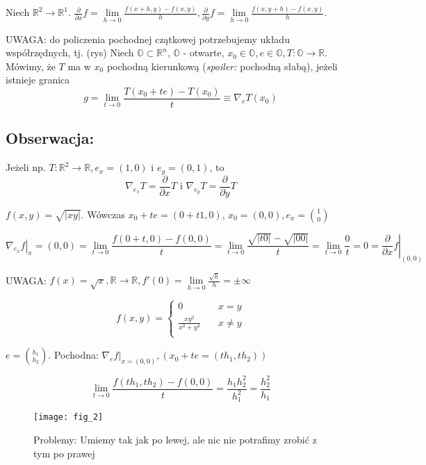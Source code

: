 \documentclass[../main.tex]{subfiles}
\begin{document}
Niech $\mathbb{R}^{2}\to\mathbb{R}^{1}$. $\frac{\partial}{\partial x} f = \lim\limits_{h \to 0}\frac{f(x+h,y) - f(x,y)}{h}, \frac{\partial}{\partial y} f = \lim\limits_{h \to 0}\frac{f(x,y+h) - f(x,y)}{h}$.\\
\vspace{0.3cm}

UWAGA: do policzenia pochodnej czątkowej potrzebujemy układu współrzędnych, tj. (rys)
\vspace{0.3cm}
Niech $\mathbb{O}\subset\mathbb{R}^{n}$, $\mathbb{O}$ - otwarte, $x_0\in\mathbb{O},e\in\mathbb{O},T:\mathbb{O}\to\mathbb{R}$.\\
Mówimy, że $T$ ma w $x_0$ pochodną kierunkową (\textit{spoiler:} pochodną słabą), jeżeli istnieje granica $$g = \lim\limits_{t \to 0}\frac{T(x_0 +te) - T(x_0)}{t} \equiv \nabla_e T(x_0)$$
\subsection{
    Obserwacja:
}
Jeżeli np. $T: \mathbb{R}^{2}\to\mathbb{R}, e_x=(1,0)$ i $e_y = (0,1)$, to $$\nabla_{e_{x}} T = \frac{\partial}{\partial x} T \text{ i } \nabla_{e_{y}} T = \frac{\partial}{\partial y} T$$

\begin{przyklad}

\end{przyklad}
$f(x,y) = \sqrt{|xy|}$. Wówczas $x_0 + te = (0+t1,0)$, $x_0 = (0,0), e_x = \binom{1}{0}$

$$\left. \nabla_{e_x} f \right |_x=(0,0) = \lim\limits_{t \to 0}\frac{f(0+t,0) - f(0,0)}{t} = \lim\limits_{t \to 0}\frac{\sqrt{|t 0|} - \sqrt{|0 0|}}{t} = \lim\limits_{t \to 0}\frac{0}{t} = 0 = \left. \frac{\partial}{\partial x} f\right |_{(0,0)}$$

UWAGA: $f(x) = \sqrt{x}, \mathbb{R}\to\mathbb{R}, f'(0) = \lim\limits_{h \to 0}\frac{\sqrt{h}}{h} = \pm \infty$

\[ f(x,y) =
\begin{cases}
    0 & \quad x=y\\
    \frac{xy^2}{x^2+y^4} & \quad x \neq y\\
\end{cases}
\]

$e = \binom{h_1}{h_2}$. Pochodna: $\left. \nabla_e f\right |_{x=(0,0)}, (x_0 + te = (th_1, th_2))$

$$\lim\limits_{t \to 0}\frac{f(th_1, th_2) - f(0,0)}{t} = \frac{h_1 h_2^2}{h_1^2} = \frac{h_2^2}{h_1}$$

\begin{figure}
    \centering
    \texttt{[image: fig\_2]}
    \caption{Problemy: Umiemy tak jak po lewej, ale nic nie potrafimy zrobić z tym po prawej}
    \label{fig:fig_2}
\end{figure}
\end{document}
